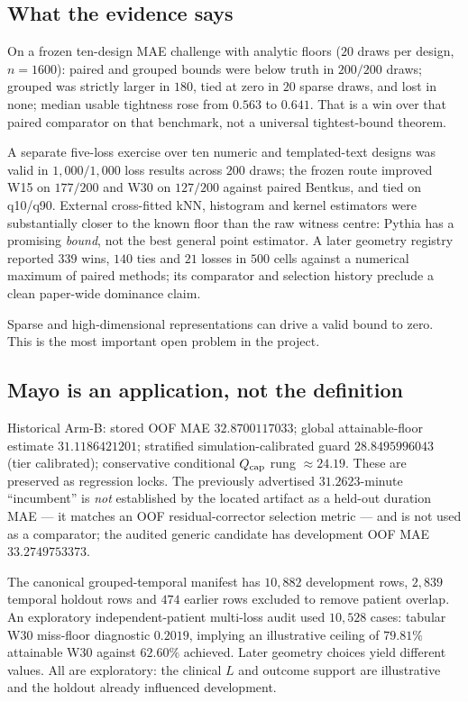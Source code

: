 \documentclass[11pt,a4paper]{article}
\theoremstyle{definition}
\theoremstyle{remark}
\newcommand{\tier}[1]{\textsf{#1}}
\begin{document}
\subsection{What the evidence says}

On a frozen ten-design MAE challenge with analytic floors ($20$ draws per design, $n=1600$): paired and grouped bounds were below truth in $200/200$ draws; grouped was strictly larger in $180$, tied at zero in $20$ sparse draws, and lost in none; median usable tightness rose from $0.563$ to $0.641$. That is a win over that paired comparator on that benchmark, not a universal tightest-bound theorem.

A separate five-loss exercise over ten numeric and templated-text designs was valid in $1{,}000/1{,}000$ loss results across $200$ draws; the frozen route improved W15 on $177/200$ and W30 on $127/200$ against paired Bentkus, and tied on q10/q90. External cross-fitted kNN, histogram and kernel estimators were substantially closer to the known floor than the raw witness centre: Pythia has a promising \emph{bound}, not the best general point estimator. A later geometry registry reported $339$ wins, $140$ ties and $21$ losses in $500$ cells against a numerical maximum of paired methods; its comparator and selection history preclude a clean paper-wide dominance claim.

Sparse and high-dimensional representations can drive a valid bound to zero. This is the most important open problem in the project.

\subsection{Mayo is an application, not the definition}

Historical Arm-B: stored OOF MAE $32.8700117033$; global attainable-floor estimate $31.1186421201$; stratified simulation-calibrated guard $28.8495996043$ (tier \tier{calibrated}); conservative conditional $Q_{\rm cap}$ rung $\approx24.19$. These are preserved as regression locks. The previously advertised $31.2623$-minute ``incumbent'' is \emph{not} established by the located artifact as a held-out duration MAE --- it matches an OOF residual-corrector selection metric --- and is not used as a comparator; the audited generic candidate has development OOF MAE $33.2749753373$.

The canonical grouped-temporal manifest has $10{,}882$ development rows, $2{,}839$ temporal holdout rows and $474$ earlier rows excluded to remove patient overlap. An exploratory independent-patient multi-loss audit used $10{,}528$ cases: tabular W30 miss-floor diagnostic $0.2019$, implying an illustrative ceiling of $79.81\%$ attainable W30 against $62.60\%$ achieved. Later geometry choices yield different values. All are \tier{exploratory}: the clinical $L$ and outcome support are illustrative and the holdout already influenced development.
\end{document}
